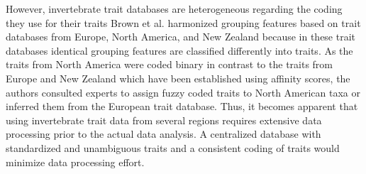 \documentclass{article}
\begin{document}
However, invertebrate trait databases are heterogeneous regarding the coding they use for their traits \cite{culp_incorporating_2011} 
Brown et al. \cite{brown_functional_2018} harmonized grouping features based on trait databases from Europe, North America, and New Zealand because in these trait databases identical grouping features are classified differently into traits. As the traits from North America were coded binary in contrast to the traits from Europe and New Zealand which have been established using affinity scores, the authors consulted experts to assign fuzzy coded traits to North American taxa or inferred them from the European trait database. Thus, it becomes apparent that using invertebrate trait data from several regions requires extensive data processing prior to the actual data analysis. A centralized database with standardized and unambiguous traits and a consistent coding of traits would minimize data processing effort.
\end{document}
